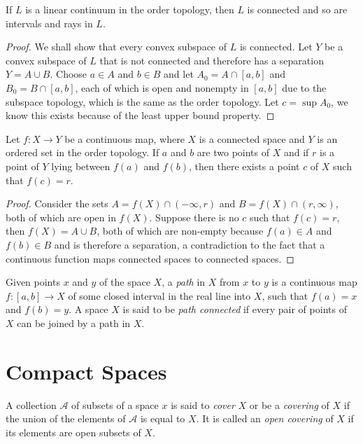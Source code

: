 \begin{theorem}
    If $L$ is a linear continuum in the order topology, then $L$ is connected and so are intervals and rays in $L$.
\end{theorem}
\begin{proof}
    We shall show that every convex subspace of $L$ is connected. Let $Y$ be a convex subspace of $L$ that is not connected and therefore has a separation $Y = A\cup B$. Choose $a\in A$ and $b\in B$ and let $A_0 = A\cap[a,b]$ and $B_0 = B\cap[a,b]$, each of which is open and nonempty in $[a,b]$ due to the subspace topology, which is the same as the order topology. Let $c = \sup A_0$, we know this exists because of the least upper bound property.
\end{proof}

\begin{theorem}
    Let $f:X\to Y$ be a continuous map, where $X$ is a connected space and $Y$ is an ordered set in the order topology. If $a$ and $b$ are two points of $X$ and if $r$ is a point of $Y$ lying between $f(a)$ and $f(b)$, then there exists a point $c$ of $X$ such that $f(c) = r$.
\end{theorem}
\begin{proof}
    Consider the sets $A = f(X)\cap(-\infty, r)$ and $B = f(X)\cap(r,\infty)$, both of which are open in $f(X)$. Suppose there is no $c$ such that $f(c) = r$, then $f(X) = A\cup B$, both of which are non-empty because $f(a)\in A$ and $f(b)\in B$ and is therefore a separation, a contradiction to the fact that a continuous function maps connected spaces to connected spaces.
\end{proof}

\begin{definition}
    Given points $x$ and $y$ of the space $X$, a \textit{path} in $X$ from $x$ to $y$ is a continuous map $f:[a,b]\to X$ of some closed interval in the real line into $X$, such that $f(a) = x$ and $f(b) = y$. A space $X$ is said to be \textit{path connected} if every pair of points of $X$ can be joined by a path in $X$.
\end{definition}

\section{Compact Spaces}
\begin{definition}[Cover]
    A collection $\mathscr{A}$ of subsets of a space $x$ is said to \textit{cover} $X$ or be a \textit{covering} of $X$ if the union of the elements of $\mathscr{A}$ is equal to $X$. It is called an \textit{open covering} of $X$ if its elements are open subsets of $X$.
\end{definition}

